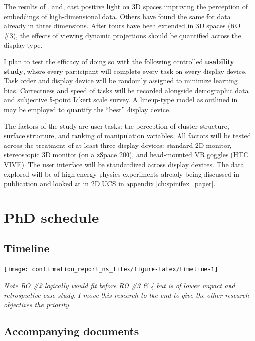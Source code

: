 \documentclass{monashthesis}
\begin{document}
The results of \textcite{wagner_filho_immersive_2018},
\textcite{nelson_xgobi_1998} and, \textcite{arms_benefits_1999} cast
positive light on 3D spaces improving the perception of embeddings of
high-dimensional data. Others have found the same for data already in
three dimensions. After tours have been extended in 3D spaces (RO \#3),
the effects of viewing dynamic projections should be quantified across
the display type.

I plan to test the efficacy of doing so with the following controlled
\textbf{usability study}, where every participant will complete every
task on every display device. Task order and display device will be
randomly assigned to minimize learning bias. Correctness and speed of
tasks will be recorded alongside demographic data and subjective 5-point
Likert scale survey. A lineup-type model as outlined in
\textcite{hofmann_graphical_2012} may be employed to quantify the
``best'' display device.

The factors of the study are user tasks: the perception of cluster
structure, surface structure, and ranking of manipulation variables. All
factors will be tested across the treatment of at least three display
devices: standard 2D monitor, stereoscopic 3D monitor (on a zSpace 200),
and head-mounted VR goggles (HTC VIVE). The user interface will be
standardized across display devices. The data explored will be of high
energy physics experiments already being discussed in publication
\autocites{wang_visualizing_2018}{cook_dynamical_2018} and looked at in
2D UCS in appendix \ref{ch:spinifex_paper}.

\chapter{PhD schedule}\label{ch:timeline}

\section{Timeline}\label{timeline}

\begin{center}\texttt{[image: confirmation\_report\_ns\_files/figure-latex/timeline-1]} \end{center}

\emph{Note RO \#2 logically would fit before RO \#3 \& 4 but is of lower
impact and retrospective case study. I move this research to the end to
give the other research objectives the priority.}

\section{Accompanying documents}\label{accompanying-documents}
\end{document}
